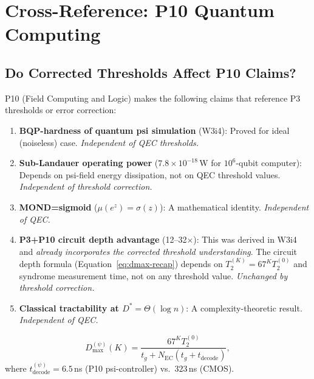 \documentclass[11pt]{article}
\theoremstyle{definition}
\theoremstyle{remark}
\begin{document}
\section{Cross-Reference: P10 Quantum Computing}
\label{sec:p10-cross-ref}

\subsection{Do Corrected Thresholds Affect P10 Claims?}
\label{sec:p10-threshold-impact}

P10 (Field Computing and Logic) makes the following claims that reference
P3 thresholds or error correction:

\begin{enumerate}
  \item \textbf{BQP-hardness of quantum psi simulation} (W3i4): Proved for
    ideal (noiseless) case.  \emph{Independent of QEC thresholds.}

  \item \textbf{Sub-Landauer operating power} ($7.8\times10^{-18}$\,W for
    $10^6$-qubit computer): Depends on psi-field energy dissipation, not on
    QEC threshold values.  \emph{Independent of threshold correction.}

  \item \textbf{MOND=sigmoid} ($\mu(e^z) = \sigma(z)$): A mathematical
    identity.  \emph{Independent of QEC.}

  \item \textbf{P3+P10 circuit depth advantage} (12--32$\times$): This was
    derived in W3i4 and \emph{already incorporates the corrected threshold
    understanding}.  The circuit depth formula
    (Equation~\ref{eq:dmax-recap}) depends on $T_2^{(K)} = 67^K T_2^{(0)}$
    and syndrome measurement time, not on any threshold value.
    \emph{Unchanged by threshold correction.}

  \item \textbf{Classical tractability at $D^* = \Theta(\log n)$}: A
    complexity-theoretic result.  \emph{Independent of QEC.}
\end{enumerate}

\begin{equation}
  D_{\max}^{(\psi)}(K) = \frac{67^K T_2^{(0)}}{t_g + N_{\mathrm{EC}}
  (t_g + t_{\mathrm{decode}})},
  \label{eq:dmax-recap}
\end{equation}
where $t_{\mathrm{decode}}^{(\psi)} = 6.5$\,ns (P10 psi-controller) vs.\
$323$\,ns (CMOS).
\end{document}
